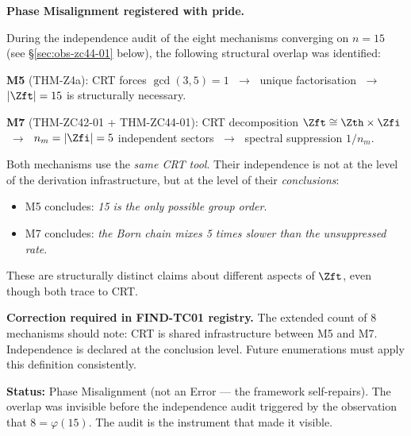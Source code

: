 \documentclass[12pt, a4paper]{article}
\providecommand{\nm}{n_m}
\providecommand{\phitot}{\varphi}
\begin{document}
\begin{openqbox}[title={PM-ZC44-01: M5 and M7 Share CRT
  Infrastructure — Independence at Conclusion Level Only}]
\textbf{Phase Misalignment registered with pride.}

During the independence audit of the eight mechanisms
converging on $n = 15$ (see \S\ref{sec:obs-zc44-01} below),
the following structural overlap was identified:

\medskip
\textbf{M5} (THM-Z4a): CRT forces $\gcd(3,5)=1$
$\;\to\;$ unique factorisation $\;\to\;$ $|{\Zft}| = 15$ is
structurally necessary.

\textbf{M7} (THM-ZC42-01 + THM-ZC44-01): CRT decomposition
$\Zft \cong \Zth\times\Zfi$
$\;\to\;$ $\nm = |\Zfi| = 5$ independent sectors
$\;\to\;$ spectral suppression $1/\nm$.

\medskip
Both mechanisms use the \emph{same CRT tool}.
Their independence is not at the level of the derivation
infrastructure, but at the level of their \emph{conclusions}:
\begin{itemize}[leftmargin=*, noitemsep]
\item M5 concludes: \emph{15 is the only possible group order}.
\item M7 concludes: \emph{the Born chain mixes 5 times slower
  than the unsuppressed rate}.
\end{itemize}
These are structurally distinct claims about different
aspects of $\Zft$, even though both trace to CRT.

\textbf{Correction required in FIND-TC01 registry.}
The extended count of 8 mechanisms should note:
CRT is shared infrastructure between M5 and M7.
Independence is declared at the conclusion level.
Future enumerations must apply this definition consistently.

\textbf{Status:} Phase Misalignment (not an Error --- the framework self-repairs).
The overlap was invisible before the independence audit
triggered by the observation that $8 = \phitot(15)$.
The audit is the instrument that made it visible.
\end{openqbox}

\end{document}
